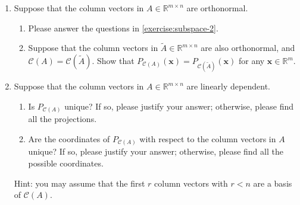 \documentclass[11pt,letter,notitlepage]{article}
\begin{document}
\begin{exercise}
\begin{enumerate}
        \item Suppose that the column vectors in $A\in\mathbb{R}^{m\times n}$ are orthonormal.
              \begin{enumerate}
                  \item Please answer the questions in \ref{exercise:subspace-2}.

                  \item Suppose that the column vectors in $\widetilde{A}\in\mathbb{R}^{m\times n}$ are also orthonormal, and $\mathcal{C}(A)=\mathcal{C}(\widetilde{A})$. Show that $P_{\mathcal{C}(A)}(\mathbf{x})=P_{\mathcal{C}(\widetilde{A})}(\mathbf{x})$ for any $\mathbf{x}\in\mathbb{R}^m$.
              \end{enumerate}

        \item Suppose that the column vectors in $A\in\mathbb{R}^{m\times n}$ are linearly dependent.
              \begin{enumerate}
                  \item Is $P_{\mathcal{C}(A)}$ unique? If so, please justify your answer; otherwise, please find all the projections.

                  \item Are the coordinates of $P_{\mathcal{C}(A)}$ with respect to the column vectors in $A$ unique? If so, please justify your answer; otherwise, please find all the possible coordinates.
              \end{enumerate}
              Hint: you may assume that the first $r$ column vectors with $r<n$ are a basis of $\mathcal{C}(A)$.
    \end{enumerate}
\end{exercise}
\end{document}

